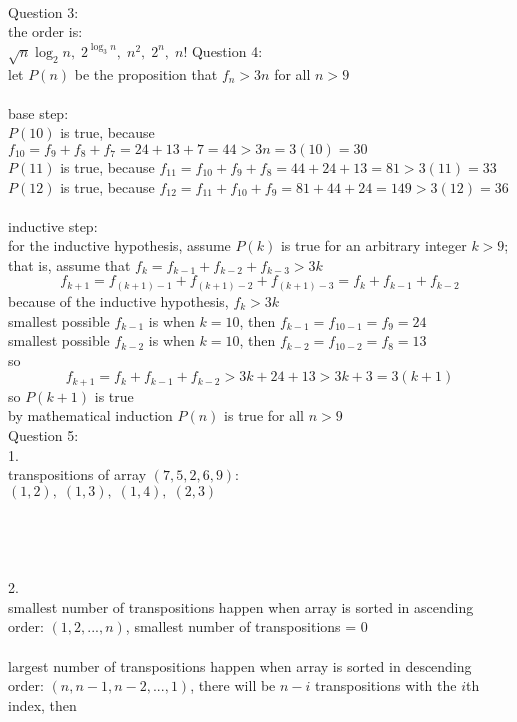 \documentclass[12pt,border=4pt,multi]{article}%
\begin{document}
\\
\newpage
\noindent
Question 3:\\
the order is:\\
{\large$\sqrt{n}\log_2 n,\;2^{\log_3 n},\; n^2,\; 2^n,\; n!$}
\newpage
\noindent
Question 4:\\
let $P(n)$ be the proposition that $f_n > 3n$ for all $n > 9$\\
\\
base step:\\
$P(10)$ is true, because $f_{10} = f_9 + f_8 + f_7 = 24 + 13 + 7 = 44 > 3n = 3(10) = 30$\\
$P(11)$ is true, because $f_{11} = f_{10} + f_9 + f_8 = 44 + 24 + 13 = 81 > 3(11) = 33$ \\
$P(12)$ is true, because $f_{12} = f_{11} + f_{10} + f_9 = 81 + 44 + 24 = 149 > 3(12) = 36$\\
\\
inductive step:\\
for the inductive hypothesis, assume $P(k)$ is true for an arbitrary integer $k > 9$; that is, assume that $f_k = f_{k - 1} + f_{k - 2} + f_{k - 3} > 3k$
\[f_{k + 1} = f_{(k + 1) - 1} + f_{(k + 1) - 2} + f_{(k + 1) - 3}
= f_k + f_{k - 1} + f_{k - 2}\]
because of the inductive hypothesis, $f_k > 3k$\\
smallest possible $f_{k - 1}$ is when $k = 10$, then $f_{k - 1} = 
f_{10 - 1} = f_9 = 24$\\
smallest possible $f_{k - 2}$ is when $k = 10$, then $f_{k - 2} = 
f_{10 - 2} = f_8 = 13$\\
so 
\[f_{k + 1} = f_k + f_{k - 1} + f_{k - 2} > 3k + 24 + 13 > 3k + 3 = 3(k + 1)\]
so $P(k + 1)$ is true\\
by mathematical induction $P(n)$ is true for all $n > 9$\\
\newpage
\noindent
Question 5:\\
1.\\
transpositions of array $(7, 5, 2, 6, 9)$:\\
$(1,2),\; (1,3),\; (1,4),\;(2,3)$\\
\\
\\
\\
\\
2.\\
smallest number of transpositions happen when array is sorted in ascending order: $(1, 2, ..., n)$, smallest number of transpositions = 0\\
\\
largest number of transpositions happen when array is sorted in descending order: $(n, n - 1, n - 2, ..., 1)$, there will be $n - i$ transpositions with the $i$th index, then
\end{document}
